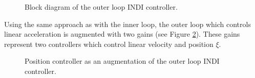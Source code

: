 \documentclass[11pt, a4paper, twoside]{report}
\begin{document}
\begin{figure}[H]
	\centering 
	\captionsetup{justification=centering, singlelinecheck=off, font=bf, belowskip=-0.5cm}
	\caption[Block diagram of the outer loop \acrshort{INDI} controller.]{Block diagram of the outer loop \acrshort{INDI} controller.}
	\label{fig:indi_outer_croped}
\end{figure}
Using the same approach as with the inner loop, the outer loop which controls linear acceleration is augmented with two gains (see Figure \ref{fig:pid_outer_croped}). These gains represent two controllers which control linear velocity and position $\xi$. 
\begin{figure}[H]
	\centering 
	\captionsetup{justification=centering, singlelinecheck=off, font=bf, belowskip=-0.5cm}
	\caption[Position controller as an augmentation of the outer loop \acrshort{INDI} controller]{Position controller as an augmentation of the outer loop \acrshort{INDI} controller.}
	\label{fig:pid_outer_croped}
\end{figure}
\end{document}
